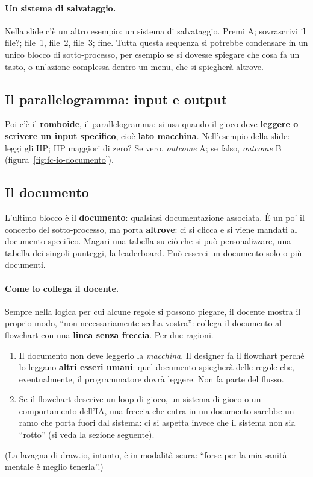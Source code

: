 \paragraph{Un sistema di salvataggio.} Nella slide c'è un altro esempio:
un sistema di salvataggio. Premi A; sovrascrivi il file?; file~1, file~2,
file~3; fine. Tutta questa sequenza si potrebbe condensare in un unico
blocco di sotto-processo, per esempio se si dovesse spiegare che cosa fa un
tasto, o un'azione complessa dentro un menu, che si spiegherà altrove.

\subsection{Il parallelogramma: input e output}

Poi c'è il \textbf{romboide}, il parallelogramma: si usa quando il gioco deve
\textbf{leggere o scrivere un input specifico}, cioè \textbf{lato
macchina}. Nell'esempio della slide: leggi gli HP; HP maggiori di zero? Se
vero, \emph{outcome} A; se falso, \emph{outcome} B
(figura~\ref{fig:fc-io-documento}).

\subsection{Il documento}

L'ultimo blocco è il \textbf{documento}: qualsiasi documentazione associata.
È un po' il concetto del sotto-processo, ma porta \textbf{altrove}: ci si
clicca e si viene mandati al documento specifico. Magari una tabella su ciò
che si può personalizzare, una tabella dei singoli punteggi, la leaderboard.
Può esserci un documento solo o più documenti.

\paragraph{Come lo collega il docente.} Sempre nella logica per cui alcune
regole si possono piegare, il docente mostra il proprio modo, ``non
necessariamente scelta vostra'': collega il documento al flowchart con una
\textbf{linea senza freccia}. Per due ragioni.
\begin{enumerate}
  \item Il documento non deve leggerlo la \emph{macchina}. Il designer fa il
        flowchart perché lo leggano \textbf{altri esseri umani}: quel
        documento spiegherà delle regole che, eventualmente, il programmatore
        dovrà leggere. Non fa parte del flusso.
  \item Se il flowchart descrive un loop di gioco, un sistema di gioco o un
        comportamento dell'IA, una freccia che entra in un documento sarebbe
        un ramo che porta fuori dal sistema: ci si aspetta invece che il
        sistema non sia ``rotto'' (si veda la sezione seguente).
\end{enumerate}
(La lavagna di draw.io, intanto, è in modalità scura: ``forse per la mia
sanità mentale è meglio tenerla''.)

